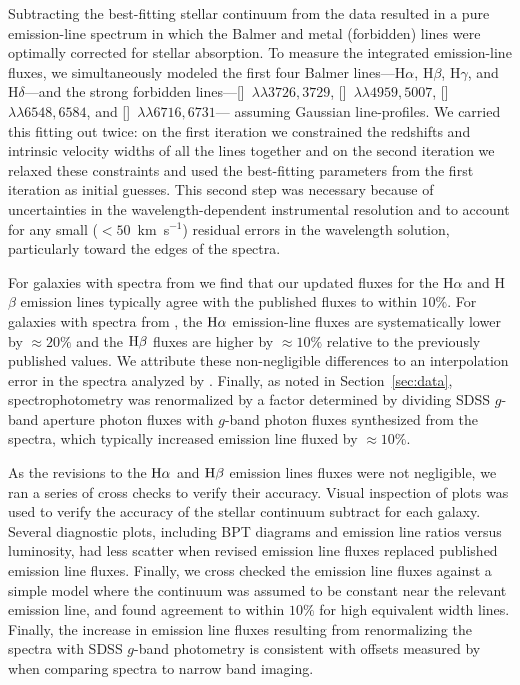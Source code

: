 \documentclass[preprint]{aastex61}
\begin{document}
Subtracting the best-fitting stellar continuum from the data resulted in a pure emission-line spectrum in which the Balmer and metal (forbidden) lines were optimally corrected for stellar absorption.  To measure the integrated emission-line fluxes, we simultaneously modeled the first four Balmer lines---H$\alpha$, H$\beta$, H$\gamma$, and H$\delta$---and the strong forbidden lines---[]~$\lambda\lambda3726,3729$, []~$\lambda\lambda4959,5007$, []~$\lambda\lambda6548,6584$, and []~$\lambda\lambda6716,6731$--- assuming Gaussian line-profiles.  We carried this fitting out twice: on the first iteration we constrained the redshifts and intrinsic velocity widths of all the lines together and on the second iteration we relaxed these constraints and used the best-fitting parameters from the first iteration as initial guesses.  This second step was necessary because of uncertainties in the wavelength-dependent instrumental resolution and to account for any small ($<50$~km~s$^{-1}$) residual errors in the wavelength solution, particularly toward the edges of the spectra.

For galaxies with spectra from \citet{mou06} we find that our updated fluxes for the H$\alpha$ and H$\beta$ emission lines typically agree with the published fluxes to within $10\%$.  For galaxies with spectra from \citet{mou10}, the ${\rm H \alpha}$ emission-line fluxes are systematically lower by $\approx 20\%$ and the ${\rm H\beta}$ fluxes are higher by $\approx 10\%$ relative to the previously published values.  We attribute these non-negligible differences to an interpolation error in the spectra analyzed by \citet{mou10}. Finally, as noted in Section~\ref{sec:data}, spectrophotometry was renormalized by a factor determined by dividing SDSS $g$-band aperture photon fluxes with $g$-band photon fluxes synthesized from the spectra, which typically increased emission line fluxed by $\approx 10\%$. 

As the revisions to the ${\rm H \alpha}$ and ${\rm H \beta}$ emission lines fluxes were not negligible, we ran a series of cross checks to verify their accuracy. Visual inspection of plots was used to verify the accuracy of the stellar continuum subtract for each galaxy. Several diagnostic plots, including BPT diagrams and emission line ratios versus luminosity, had less scatter when revised emission line fluxes replaced published emission line fluxes. Finally, we cross checked the emission line fluxes against a simple model where the continuum was assumed to be constant near the relevant emission line, and found agreement to within $10\%$ for high equivalent width lines. Finally, the increase in emission line fluxes resulting from renormalizing the spectra with SDSS $g$-band photometry is consistent with offsets measured by \citet{ken08} when comparing \citet{mou06} spectra to narrow band imaging.
\end{document}

